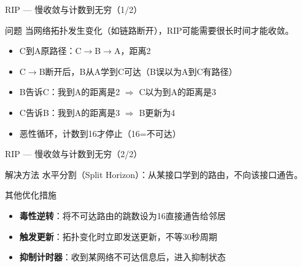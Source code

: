 \documentclass[10pt, aspectratio=169]{beamer}
\begin{document}
\begin{frame}{RIP --- 慢收敛与计数到无穷（1/2）}
    \begin{block}{问题}
        当网络拓扑发生变化（如链路断开），RIP可能需要很长时间才能收敛。
    \end{block}
    \begin{center}
    \end{center}
    \vspace{0.3em}
    \begin{itemize}
        \item C到A原路径：C$\to$B$\to$A，距离2
        \item C$\to$B断开后，B从A学到C可达（B误以为A到C有路径）
        \item B告诉C：我到A的距离是2 $\Rightarrow$ C以为到A的距离是3
        \item C告诉B：我到A的距离是3 $\Rightarrow$ B更新为4
        \item 恶性循环，计数到16才停止（16=不可达）
    \end{itemize}
\end{frame}

\begin{frame}{RIP --- 慢收敛与计数到无穷（2/2）}
    \begin{exampleblock}{解决方法}
        水平分割（Split Horizon）：从某接口学到的路由，不向该接口通告。
    \end{exampleblock}
    \vspace{0.5em}
    \begin{block}{其他优化措施}
        \begin{itemize}
            \item \textbf{毒性逆转}：将不可达路由的跳数设为16直接通告给邻居
            \item \textbf{触发更新}：拓扑变化时立即发送更新，不等30秒周期
            \item \textbf{抑制计时器}：收到某网络不可达信息后，进入抑制状态
        \end{itemize}
    \end{block}
\end{frame}
\end{document}
